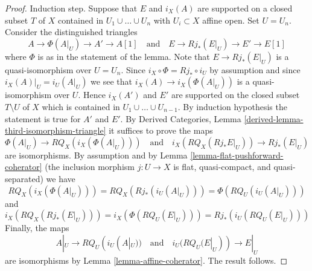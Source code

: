 \begin{proof}
\medskip\noindent
Induction step. Suppose that $E$ and $i_X(A)$ are supported on a
closed subset $T$ of $X$ contained in $U_1 \cup \ldots \cup U_n$
with $U_i \subset X$ affine open. Set $U = U_n$.
Consider the distinguished triangles
$$
A \to \Phi(A|_U) \to A' \to A[1]
\quad\text{and}\quad
E \to Rj_*(E|_U) \to E' \to E[1]
$$
where $\Phi$ is as in the statement of the lemma.
Note that $E \to Rj_*(E|_U)$ is a quasi-isomorphism over $U = U_n$.
Since $i_X \circ \Phi = Rj_* \circ i_U$ by assumption
and since $i_X(A)|_U = i_U(A|_U)$
we see that $i_X(A) \to i_X(\Phi(A|_U))$ is a quasi-isomorphism over $U$.
Hence $i_X(A')$ and $E'$ are supported on the closed
subset $T \setminus U$ of $X$ which is contained in
$U_1 \cup \ldots \cup U_{n - 1}$.
By induction hypothesis the statement is true for $A'$ and $E'$. By
Derived Categories, Lemma \ref{derived-lemma-third-isomorphism-triangle}
it suffices to prove the maps
$$
\Phi(A|_U) \to RQ_X(i_X(\Phi(A|_U)))
\quad\text{and}\quad
i_X(RQ_X(Rj_*E|_U)) \to Rj_*(E|_U)
$$
are isomorphisms. By assumption and by
Lemma \ref{lemma-flat-pushforward-coherator}
(the inclusion morphism $j : U \to X$ is flat, quasi-compact, and
quasi-separated) we have
$$
RQ_X(i_X(\Phi(A|_U))) = RQ_X(Rj_*(i_U(A|_U))) = \Phi(RQ_U(i_U(A|_U)))
$$
and
$$
i_X(RQ_X(Rj_*(E|_U))) = i_X(\Phi(RQ_U(E|_U))) = Rj_*(i_U(RQ_U(E|_U)))
$$
Finally, the maps
$$
A|_U \to RQ_U(i_U(A|_U))
\quad\text{and}\quad
i_U(RQ_U(E|_U)) \to E|_U
$$
are isomorphisms by Lemma \ref{lemma-affine-coherator}. The result follows.
\end{proof}
